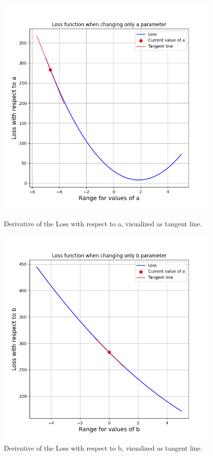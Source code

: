 \documentclass{article}
\begin{document}
    \begin{figure}[h]
        \centering
        \begin{minipage}{0.4\textwidth}
            \centering
            \includegraphics[width=\linewidth]{../images/myplot9.png}
            \caption{Derivative of the Loss with respect to a, visualized as tangent line.}
        \end{minipage}
        \hfill
        \begin{minipage}{0.4\textwidth}
            \centering
            \includegraphics[width=\linewidth]{../images/myplot10.png}
            \caption{Derivative of the Loss with respect to b, visualized as tangent line.}
        \end{minipage}
    \end{figure}
\end{document}
